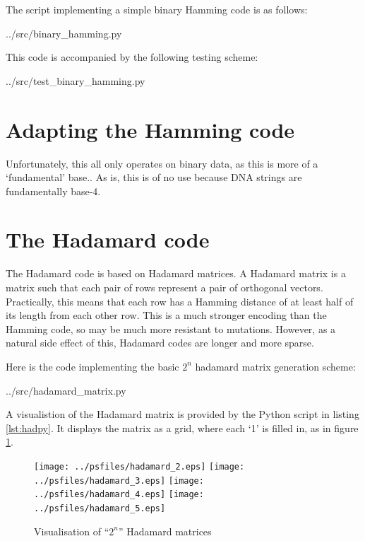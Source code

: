 \documentclass{article}
\begin{document}
    The script implementing a simple binary Hamming code is as follows:


{../src/binary_hamming.py}

    This code is accompanied by the following testing scheme:


{../src/test_binary_hamming.py}

    \section{Adapting the Hamming code}

    Unfortunately, this all only operates on binary data, as this is more of a
    `fundamental' base.. As is, this is of no use because DNA strings are
    fundamentally base-4.

    \section{The Hadamard code}


    The Hadamard code is based on Hadamard matrices. A Hadamard matrix is a
    matrix such that each pair of rows represent a pair of orthogonal vectors.
    Practically, this means that each row has a Hamming distance of at least
    half of its length from each other row. This is a much stronger encoding
    than the Hamming code, so may be much more resistant to mutations. However,
    as a natural side effect of this, Hadamard codes are longer and more sparse.

    Here is the code implementing the basic $2^n$ hadamard matrix generation
    scheme:


{../src/hadamard_matrix.py}



    A visualistion of the Hadamard matrix is provided by the Python script in
    listing \ref{lst:hadpy}. It displays the matrix as a grid, where each `1' is
    filled in, as in figure \ref{fig:hadvis}.

\begin{figure}[h]
\begin{center}
\texttt{[image: ../psfiles/hadamard\_2.eps]}%
\hfill%
\texttt{[image: ../psfiles/hadamard\_3.eps]}%
\hfill%
\texttt{[image: ../psfiles/hadamard\_4.eps]}%
\hfill%
\texttt{[image: ../psfiles/hadamard\_5.eps]}%
\end{center}
\caption{Visualisation of ``$2^n$'' Hadamard matrices}\label{fig:hadvis}
\end{figure}
\end{document}
